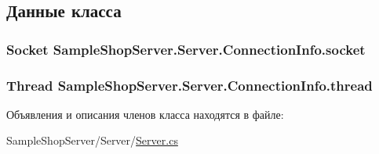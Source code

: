 \subsection{Данные класса}
\hypertarget{class_sample_shop_server_1_1_server_1_1_connection_info_aabe5d2005189b697b01bac2941174747}{}
\subsubsection[{socket}]{\setlength{\rightskip}{0pt plus 5cm}Socket Sample\+Shop\+Server.\+Server.\+Connection\+Info.\+socket}\label{class_sample_shop_server_1_1_server_1_1_connection_info_aabe5d2005189b697b01bac2941174747}
\hypertarget{class_sample_shop_server_1_1_server_1_1_connection_info_ad458ebf495f37e6bf462c7c6bae85196}{}
\subsubsection[{thread}]{\setlength{\rightskip}{0pt plus 5cm}Thread Sample\+Shop\+Server.\+Server.\+Connection\+Info.\+thread}\label{class_sample_shop_server_1_1_server_1_1_connection_info_ad458ebf495f37e6bf462c7c6bae85196}


Объявления и описания членов класса находятся в файле\+:\begin{DoxyCompactItemize}
\item 
Sample\+Shop\+Server/\+Server/\hyperlink{_server_8cs}{Server.\+cs}\end{DoxyCompactItemize}
